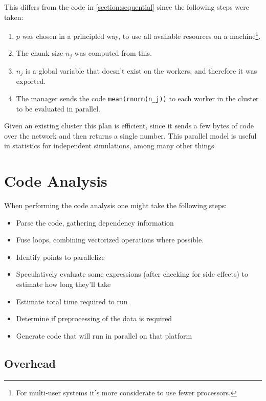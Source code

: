 \documentclass[12pt]{article}
\begin{document}
This differs from the code in \ref{section:sequential} since
the following steps were taken:
\begin{enumerate}
    \item $p$ was chosen in a principled way, to use all available
        resources on a machine\footnote{For multi-user systems it's more
        considerate to use fewer processors.}. 
    \item The chunk size $n_j$ was computed from this.
    \item $n_j$ is a global variable that doesn't exist on
        the workers, and therefore it was exported.
    \item The manager sends the code \texttt{mean(rnorm(n\_j))} to each
        worker in the cluster to be evaluated in parallel. 
\end{enumerate}

Given an existing cluster this plan is efficient, since it
sends a few bytes of code over the network and then returns a single
number. This parallel model is useful in statistics for independent
simulations, among many other things.

\section{Code Analysis}

When performing the code analysis one might take the following steps:

\begin{itemize}
    \item Parse the code, gathering dependency information
    \item Fuse loops, combining vectorized operations where possible.
    \item Identify points to parallelize
    \item Speculatively evaluate some expressions (after checking for side
        effects) to estimate how long they'll
        take
    \item Estimate total time required to run
    \item Determine if preprocessing of the data is required
    \item Generate code that will run in parallel on that platform
\end{itemize}

\subsection{Overhead}
\end{document}
